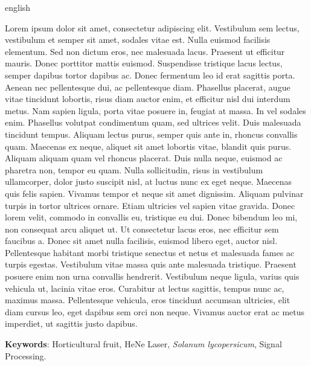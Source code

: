 \setlength{\absparsep}{18pt} %
\begin{resumo}[Abstract]
 \begin{otherlanguage*}{english}
   
Lorem ipsum dolor sit amet, consectetur adipiscing elit. Vestibulum sem lectus, vestibulum et semper sit amet, sodales vitae est. Nulla euismod facilisis elementum. Sed non dictum eros, nec malesuada lacus. Praesent ut efficitur mauris. Donec porttitor mattis euismod. Suspendisse tristique lacus lectus, semper dapibus tortor dapibus ac. Donec fermentum leo id erat sagittis porta. Aenean nec pellentesque dui, ac pellentesque diam. Phasellus placerat, augue vitae tincidunt lobortis, risus diam auctor enim, et efficitur nisl dui interdum metus. Nam sapien ligula, porta vitae posuere in, feugiat at massa. In vel sodales enim. Phasellus volutpat condimentum quam, sed ultrices velit. Duis malesuada tincidunt tempus. Aliquam lectus purus, semper quis ante in, rhoncus convallis quam. Maecenas ex neque, aliquet sit amet lobortis vitae, blandit quis purus. Aliquam aliquam quam vel rhoncus placerat. Duis nulla neque, euismod ac pharetra non, tempor eu quam. Nulla sollicitudin, risus in vestibulum ullamcorper, dolor justo suscipit nisl, at luctus nunc ex eget neque. Maecenas quis felis sapien. Vivamus tempor et neque sit amet dignissim. Aliquam pulvinar turpis in tortor ultrices ornare. Etiam ultricies vel sapien vitae gravida. Donec lorem velit, commodo in convallis eu, tristique eu dui. Donec bibendum leo mi, non consequat arcu aliquet ut. Ut consectetur lacus eros, nec efficitur sem faucibus a. Donec sit amet nulla facilisis, euismod libero eget, auctor nisl. Pellentesque habitant morbi tristique senectus et netus et malesuada fames ac turpis egestas. Vestibulum vitae massa quis ante malesuada tristique. Praesent posuere enim non urna convallis hendrerit. Vestibulum neque ligula, varius quis vehicula ut, lacinia vitae eros. Curabitur at lectus sagittis, tempus nunc ac, maximus massa. Pellentesque vehicula, eros tincidunt accumsan ultricies, elit diam cursus leo, eget dapibus sem orci non neque. Vivamus auctor erat ac metus imperdiet, ut sagittis justo dapibus.


 \textbf{Keywords}: Horticultural fruit, HeNe Laser, \emph{Solanum lycopersicum}, Signal Processing.
 \end{otherlanguage*}
\end{resumo}